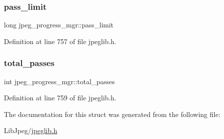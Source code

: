 \subsubsection{\texorpdfstring{pass\_limit}{pass\_limit}}
{\footnotesize\ttfamily long jpeg\+\_\+progress\+\_\+mgr\+::pass\+\_\+limit}



Definition at line 757 of file jpeglib.\+h.

\mbox{\label{structjpeg__progress__mgr_a35d61747861f284526a9b312b3dc59ca}} 
\subsubsection{\texorpdfstring{total\_passes}{total\_passes}}
{\footnotesize\ttfamily int jpeg\+\_\+progress\+\_\+mgr\+::total\+\_\+passes}



Definition at line 759 of file jpeglib.\+h.



The documentation for this struct was generated from the following file\+:\begin{DoxyCompactItemize}
\item 
Lib\+Jpeg/\mbox{\hyperlink{jpeglib_8h}{jpeglib.\+h}}\end{DoxyCompactItemize}
